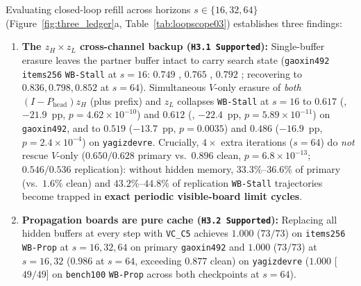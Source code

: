 \documentclass[10pt,letterpaper]{article}
\newcommand{\Phead}{P_{\mathrm{head}}}
\begin{document}
Evaluating closed-loop refill across horizons $s \in \{16, 32, 64\}$ (Figure~\ref{fig:three_ledger}a, Table~\ref{tab:loopscope03}) establishes three findings:
\begin{enumerate}[topsep=3pt,itemsep=2pt]
  \item \textbf{The $z_H \times z_L$ cross-channel backup (\texttt{H3.1 Supported}):} Single-buffer erasure leaves the partner buffer intact to carry search state (\texttt{gaoxin492} \texttt{items256} \texttt{WB-Stall} at $s=16$: $0.749$ , $0.765$ , $0.792$ ; recovering to $0.836, 0.798, 0.852$ at $s=64$). Simultaneous $V$-only erasure of \emph{both} $(I-\Phead)z_H$ (plus prefix) and $z_L$ collapses \texttt{WB-Stall} at $s=16$ to $\mathbf{0.617}$ (, $-21.9$~pp, $p=4.62\times 10^{-10}$) and $\mathbf{0.612}$ (, $-22.4$~pp, $p=5.89\times 10^{-11}$) on \texttt{gaoxin492}, and to $\mathbf{0.519}$ ($-13.7$~pp, $p=0.0035$) and $\mathbf{0.486}$ ($-16.9$~pp, $p=2.4\times 10^{-4}$) on \texttt{yagizdevre}. Crucially, $4\times$ extra iterations ($s=64$) do \emph{not} rescue $V$-only ($0.650/0.628$ primary vs.\ $0.896$ clean, $p=6.8\times 10^{-13}$; $0.546/0.536$ replication): without hidden memory, $\mathbf{33.3\%}$--$\mathbf{36.6\%}$ of primary (vs.\ $1.6\%$ clean) and $\mathbf{43.2\%}$--$\mathbf{44.8\%}$ of replication \texttt{WB-Stall} trajectories become trapped in \textbf{exact periodic visible-board limit cycles}.
  \item \textbf{Propagation boards are pure cache (\texttt{H3.2 Supported}):} Replacing all hidden buffers at every step with \texttt{VC\_C5} achieves $\mathbf{1.000}$ ($73/73$) on \texttt{items256} \texttt{WB-Prop} at $s=16, 32, 64$ on primary \texttt{gaoxin492} and $\mathbf{1.000}$ ($73/73$) at $s=16, 32$ ($0.986$ at $s=64$, exceeding $0.877$ clean) on \texttt{yagizdevre} ($1.000$ [$49/49$] on \texttt{bench100} \texttt{WB-Prop} across both checkpoints at $s=64$).

\end{enumerate}
\end{document}
